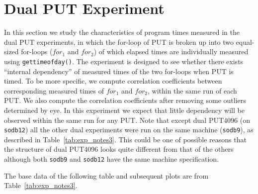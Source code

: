 \documentclass[10pt]{article}
\begin{document}
\clearpage
\newpage

\section{Dual PUT Experiment~\label{sec:dual_put}}
In this section we study the characteristics of program times measured in the dual PUT experiments, 
in which the for-loop of PUT is broken up into two equal-sized for-loops ($for_{1}$ and $for_{2}$) 
of which elapsed times are individually measured using {\tt gettimeofday()}.
The experiment is designed to see whether there exists ``internal dependency'' of measured times of the two for-loops when PUT is timed.
To be more specific, we compute correlation coefficients between corresponding measured times of $for_{1}$ and $for_{2}$, 
within the same run of each PUT. 
We also compute the correlation coefficients after removing some outliers determined by eye. 
In this experiment we expect that little dependency will be observed within the same run for any PUT.
Note that except dual PUT4096 (on {\tt sodb12}) all the other dual experiments were run on the same machine ({\tt sodb9}), as described in Table~\ref{tab:exp_notes3}. 
This could be one of possible reasons that the structure of dual PUT4096 looks quite different from that of the others 
although both {\tt sodb9} and {\tt sodb12} have the same machine specification.


The base data of the following table and subsequent plots are from Table~\ref{tab:exp_notes3}.
\end{document}
